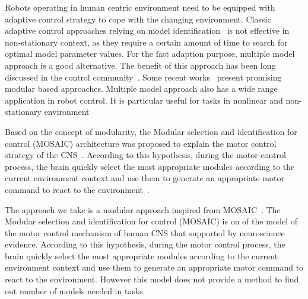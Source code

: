

Robots operating in human centric environment need to be equipped with adaptive control strategy to cope with the changing environment. Classic adaptive control approaches relying on model identification~\cite{khalil2004modeling} is not effective in non-stationary context, as they require a certain amount of time to search for optimal model parameter values. For the fast adaption purpose, multiple model approach is a good alternative. The benefit of this approach has been long discussed in the control community~\cite{jacobs1991adaptive,narendra1995adaptation,narendra1997adaptive}. Some recent works~\cite{fekri2007robust,kuipers2010multiple} present promising modular based approaches. Multiple model approach also has a wide range application in robot control. It is particular useful for tasks in nonlinear and non-stationary environment~\cite{petkos2006learning,sugimoto2012emosaic}


Based on the concept of modularity, the Modular selection and identification for control (MOSAIC) architecture was proposed to explain the motor control strategy of the CNS~\cite{wolpert1998multiple}. According to this hypothesis, during the motor control process, the brain quickly select the most appropriate modules according to the current environment context and use them to generate an appropriate motor command to react to the environment~\cite{haruno2001mosaic}.




The approach we take is a modular approach inspired from MOSAIC~\cite{haruno2001mosaic}. The Modular selection and identification for control (MOSAIC) is on of the model of the motor control mechanism of human CNS that supported by neuroscience evidence. According to this hypothesis, during the motor control process, the brain quickly select the most appropriate modules according to the current environment context and use them to generate an appropriate motor command to react to the environment. However this model does not provide a method to find out number of models needed in tasks. 


